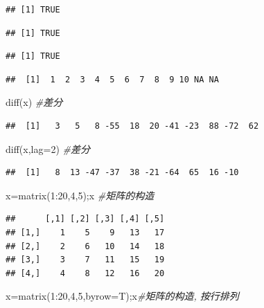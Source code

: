 \documentclass[
]{book}
\newenvironment{Shaded}{\begin{snugshade}}{\end{snugshade}}
\newcommand{\AttributeTok}[1]{\textcolor[rgb]{0.77,0.63,0.00}{#1}}
\newcommand{\CommentTok}[1]{\textcolor[rgb]{0.56,0.35,0.01}{\textit{#1}}}
\newcommand{\DecValTok}[1]{\textcolor[rgb]{0.00,0.00,0.81}{#1}}
\newcommand{\FunctionTok}[1]{\textcolor[rgb]{0.00,0.00,0.00}{#1}}
\newcommand{\NormalTok}[1]{#1}
\newcommand{\OtherTok}[1]{\textcolor[rgb]{0.56,0.35,0.01}{#1}}
\newcommand{\SpecialCharTok}[1]{\textcolor[rgb]{0.00,0.00,0.00}{#1}}
\begin{document}
\begin{verbatim}
## [1] TRUE
\end{verbatim}

\begin{verbatim}
## [1] TRUE
\end{verbatim}

\begin{verbatim}
## [1] TRUE
\end{verbatim}

\begin{verbatim}
##  [1]  1  2  3  4  5  6  7  8  9 10 NA NA
\end{verbatim}

\begin{Shaded}
\begin{Highlighting}[]
\FunctionTok{diff}\NormalTok{(x) }\CommentTok{\#差分}
\end{Highlighting}
\end{Shaded}

\begin{verbatim}
##  [1]   3   5   8 -55  18  20 -41 -23  88 -72  62
\end{verbatim}

\begin{Shaded}
\begin{Highlighting}[]
\FunctionTok{diff}\NormalTok{(x,}\AttributeTok{lag=}\DecValTok{2}\NormalTok{) }\CommentTok{\#差分}
\end{Highlighting}
\end{Shaded}

\begin{verbatim}
##  [1]   8  13 -47 -37  38 -21 -64  65  16 -10
\end{verbatim}

\begin{Shaded}
\begin{Highlighting}[]
\NormalTok{x}\OtherTok{=}\FunctionTok{matrix}\NormalTok{(}\DecValTok{1}\SpecialCharTok{:}\DecValTok{20}\NormalTok{,}\DecValTok{4}\NormalTok{,}\DecValTok{5}\NormalTok{);x }\CommentTok{\#矩阵的构造}
\end{Highlighting}
\end{Shaded}

\begin{verbatim}
##      [,1] [,2] [,3] [,4] [,5]
## [1,]    1    5    9   13   17
## [2,]    2    6   10   14   18
## [3,]    3    7   11   15   19
## [4,]    4    8   12   16   20
\end{verbatim}

\begin{Shaded}
\begin{Highlighting}[]
\NormalTok{x}\OtherTok{=}\FunctionTok{matrix}\NormalTok{(}\DecValTok{1}\SpecialCharTok{:}\DecValTok{20}\NormalTok{,}\DecValTok{4}\NormalTok{,}\DecValTok{5}\NormalTok{,}\AttributeTok{byrow=}\NormalTok{T);x}\CommentTok{\#矩阵的构造, 按行排列}
\end{Highlighting}
\end{Shaded}
\end{document}
